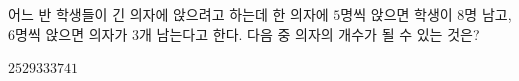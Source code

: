 어느 반 학생들이 긴 의자에 앉으려고 하는데 한 의자에 $5$명씩 앉으면 학생이 $8$명 남고, $6$명씩 앉으면 의자가 $3$개 남는다고 한다. 다음 중 의자의 개수가 될 수 있는 것은?
\begin{choices32}{$25$}{$29$}{$33$}{$37$}{$41$}\end{choices32}
